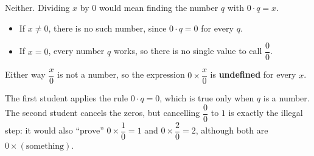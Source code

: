 Neither. Dividing $x$ by $0$ would mean finding the number $q$ with $0\cdot q=x$.
\begin{itemize}
\item If $x\ne0$, there is no such number, since $0\cdot q=0$ for every $q$.
\item If $x=0$, every number $q$ works, so there is no single value to call $\dfrac{0}{0}$.
\end{itemize}
Either way $\dfrac{x}{0}$ is not a number, so the expression $0\times\dfrac{x}{0}$ is \textbf{undefined} for every $x$.

The first student applies the rule $0\cdot q=0$, which is true only when $q$ is a number. The second student cancels the zeros, but cancelling $\dfrac{0}{0}$ to $1$ is exactly the illegal step: it would also ``prove'' $0\times\dfrac{1}{0}=1$ and $0\times\dfrac{2}{0}=2$, although both are $0\times(\text{something})$.
